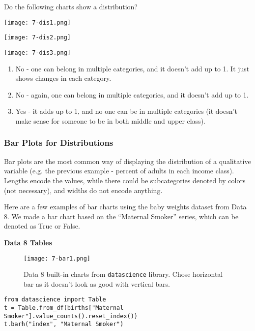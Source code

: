 \begin{example}[]{Do the following charts show a distribution?

\begin{minipage}{0.3\textwidth}
\begin{center}
\texttt{[image: 7-dis1.png]}
\end{center}    
\end{minipage}
\begin{minipage}{0.3\textwidth}
\begin{center}
\texttt{[image: 7-dis2.png]}
\end{center}    
\end{minipage}
\begin{minipage}{0.4\textwidth}
\begin{center}
\texttt{[image: 7-dis3.png]}
\end{center}
\end{minipage}
\tcbline 
\begin{enumerate}
\item No - one can belong in multiple categories, and it doesn't add up to 1. It just shows changes in each category.
\item No - again, one can belong in multiple categories, and it doesn't add up to 1.
\item Yes - it adds up to 1, and no one can be in multiple categories (it doesn't make sense for someone to be in both middle and upper class).
\end{enumerate}
}
\end{example}

\subsubsection{Bar Plots for Distributions}
Bar plots are the most common way of displaying the distribution of a qualitative variable (e.g. the previous example - percent of adults in each income class). Lengths encode the values, while there could be subcategories denoted by colors (not necessary), and widths do not encode anything.

Here are a few examples of bar charts using the baby weights dataset from Data 8. We made a bar chart based on the ``Maternal Smoker'' series, which can be denoted as True or False.

\textbf{Data 8 Tables}

\begin{figure}[ht]
\texttt{[image: 7-bar1.png]}\centering\caption{Data 8 built-in charts from \texttt{datascience} library. Chose horizontal bar as it doesn't look as good with vertical bars.}
\end{figure}
\begin{verbatim}
from datascience import Table
t = Table.from_df(births["Maternal Smoker"].value_counts().reset_index())
t.barh("index", "Maternal Smoker")
\end{verbatim}

